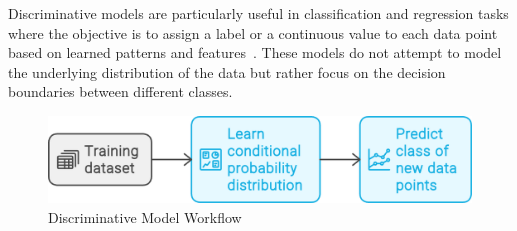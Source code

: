 \documentclass[12pt,DIV14,BCOR12mm,a4paper,footinclude=false,headinclude,parskip=half-,twoside,openright,cleardoublepage=empty,toc=index,bibliography=totoc,listof=totoc]{scrreprt}
\numberwithin{equation}{chapter}
\begin{document}
Discriminative models are particularly useful in classification and regression tasks where the objective is to assign a label or a continuous value to each data point based on learned patterns and features~\cite{wikipedia2024}. These models do not attempt to model the underlying distribution of the data but rather focus on the decision boundaries between different classes.

\begin{figure}
	\centering
	\includegraphics[scale=.3]{../media/Discriminative_model.png}
	\caption{Discriminative Model Workflow~\cite{Nanda:2024}}
	\label{disc}
\end{figure}
\end{document}
